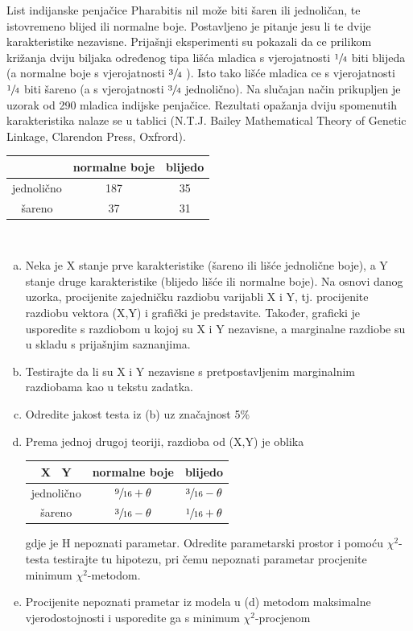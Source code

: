 \documentclass[11pt]{article}
\begin{document}
List indijanske penjačice Pharabitis nil može biti šaren ili jednoličan, te istovremeno blijed ili
normalne boje. Postavljeno je pitanje jesu li te dvije karakteristike nezavisne. Prijašnji
eksperimenti su pokazali da ce prilikom križanja dviju biljaka određenog tipa lišća mladica s
vjerojatnosti $\sfrac{1}{4}$ biti blijeda (a normalne boje s vjerojatnosti $\sfrac{3}{4}$ ). Isto tako lišće mladica ce s
vjerojatnosti $\sfrac{1}{4}$ biti šareno (a s vjerojatnosti $\sfrac{3}{4}$ jednolično). Na slučajan način prikupljen je
uzorak od 290 mladica indijske penjačice. Rezultati opažanja dviju spomenutih karakteristika
nalaze se u tablici (N.T.J. Bailey Mathematical Theory of Genetic Linkage, Clarendon Press,
Oxfrord).
\begin{center}
\begin{tabular}{|c|c|c|}
\hline 
 & normalne boje & blijedo \\ 
\hline 
jednolično & 187 & 35 \\ 
\hline 
šareno & 37 & 31 \\ 
\hline 
\end{tabular} \\
\end{center}
\begin{enumerate}[(a)]

\item Neka je X stanje prve karakteristike (šareno ili lišće jednolične boje), a Y stanje druge
karakteristike (blijedo lišće ili normalne boje). Na osnovi danog uzorka, procijenite zajedničku
razdiobu varijabli X i Y, tj. procijenite razdiobu vektora (X,Y) i grafički je predstavite.
Također, graficki je usporedite s razdiobom u kojoj su X i Y nezavisne, a marginalne razdiobe
su u skladu s prijašnjim saznanjima.
\item Testirajte da li su X i Y nezavisne s pretpostavljenim marginalnim razdiobama kao u
tekstu zadatka.
\item Odredite jakost testa iz (b) uz značajnost 5\%
\item Prema jednoj drugoj teoriji, razdioba od (X,Y) je oblika
\begin{center}
\begin{tabular}{|c|c|c|}
\hline 
X \ Y & normalne boje & blijedo \\ 
\hline 
jednolično & $\sfrac{9}{16} + \theta $ & $\sfrac{3}{16} - \theta $ \\ 
\hline 
šareno & $\sfrac{3}{16} - \theta $ & $\sfrac{1}{16} + \theta $ \\ 
\hline 
\end{tabular} 
\end{center}
gdje je H nepoznati parametar. Odredite parametarski prostor i pomoću 
$ \chi ^2$-testa testirajte
tu hipotezu, pri čemu nepoznati parametar procjenite minimum $ \chi ^2$-metodom.
\item Procijenite nepoznati prametar iz modela u (d) metodom maksimalne vjerodostojnosti
i usporedite ga s minimum $ \chi ^2$-procjenom

\end{enumerate}
\end{document}
